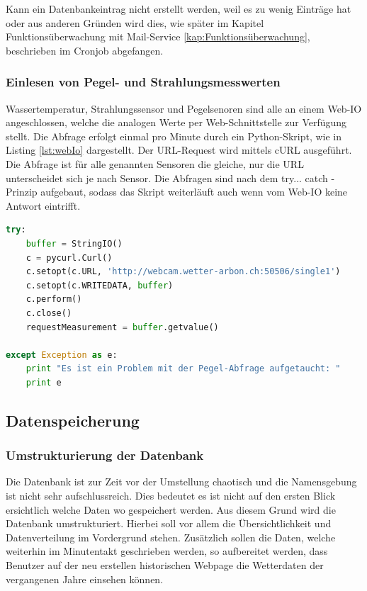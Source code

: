 Kann ein Datenbankeintrag nicht erstellt werden, weil es zu wenig Einträge hat oder aus anderen Gründen wird dies, wie später im Kapitel Funktionsüberwachung mit Mail-Service \ref{kap:Funktionsüberwachung}, beschrieben im Cronjob abgefangen.  

\subsubsection{Einlesen von Pegel- und Strahlungsmesswerten}
Wassertemperatur, Strahlungssensor und Pegelsenoren sind alle an einem Web-IO angeschlossen, welche die analogen Werte per Web-Schnittstelle zur Verfügung stellt. Die Abfrage erfolgt einmal pro Minute durch ein Python-Skript, wie in Listing \ref{lst:webIo} dargestellt. Der URL-Request wird mittels cURL ausgeführt. Die Abfrage ist für alle genannten Sensoren die gleiche, nur die URL unterscheidet sich je nach Sensor. Die Abfragen sind nach dem try... catch - Prinzip aufgebaut, sodass das Skript weiterläuft auch wenn vom Web-IO keine Antwort eintrifft.

\begin{lstlisting}[label=lst:webIo,caption=Web-Abfrage des Pegel-Messwerts, language=python, style=py]
try:
    buffer = StringIO()
    c = pycurl.Curl()
    c.setopt(c.URL, 'http://webcam.wetter-arbon.ch:50506/single1')
    c.setopt(c.WRITEDATA, buffer)
    c.perform()
    c.close()
    requestMeasurement = buffer.getvalue()

except Exception as e:
    print "Es ist ein Problem mit der Pegel-Abfrage aufgetaucht: "
    print e
\end{lstlisting}


\subsection{Datenspeicherung}
\subsubsection{Umstrukturierung der Datenbank}
Die Datenbank ist zur Zeit vor der Umstellung chaotisch und die Namensgebung ist nicht sehr aufschlussreich. Dies bedeutet es ist nicht auf den ersten Blick ersichtlich welche Daten wo gespeichert werden. Aus diesem Grund wird die Datenbank umstrukturiert. Hierbei soll vor allem die Übersichtlichkeit und Datenverteilung im Vordergrund stehen. Zusätzlich sollen die Daten, welche weiterhin im Minutentakt geschrieben werden, so aufbereitet werden, dass Benutzer auf der neu erstellen historischen Webpage die Wetterdaten der vergangenen Jahre einsehen können.

